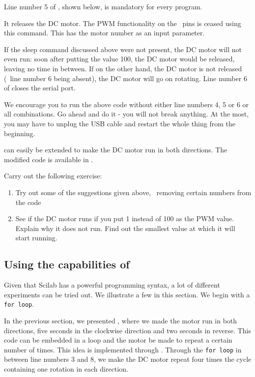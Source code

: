 Line number 5 of , shown below, is mandatory
for every program.

It releases the DC motor.  The PWM functionality on the \arduino\ pins
is ceased using this command.  This has the motor number as an input
parameter.

If the sleep command discussed above were not present, the DC motor
will not even run: soon after putting the value 100, the DC motor
would be released, leaving no time in between.  If on the other hand,
the DC motor is not released (\ie\ line number 6 being absent), the DC
motor will go on rotating.  Line number 6 of 
closes the serial port.

We encourage you to run the above code without either line numbers 4,
5 or 6 or all combinations.  Go ahead and do it - you will not break
anything.  At the most, you may have to unplug the USB cable and
restart the whole thing from the beginning.

 can easily be extended to make the DC motor
run in both directions.  The modified code is available in
.

\begin{exercise}
Carry out the following exercise:
\begin{enumerate}
\item Try out some of the suggestions given above, \ie\ removing
  certain numbers from the code
\item See if the DC motor runs if you put 1 instead of 100 as the PWM
  value.  Explain why it does not run.  Find out the smallest value at
  which it will start running.
\end{enumerate}
\end{exercise}

\subsection{Using the capabilities of \scilab}
Given that Scilab has a powerful programming syntax, a lot of
different experiments can be tried out.  We illustrate a few in this
section.  We begin with a {\tt for loop}.

In the previous section, we presented , where
we made the motor run in both directions, five seconds in the
clockwise direction and two seconds in reverse.  This code can be
embedded in a loop and the motor be made to repeat a certain number of
times.  This idea is implemented through .
Through the {\tt for loop} in between line numbers 3 and 8, we make
the DC motor repeat four times the cycle containing one rotation in
each direction. 

